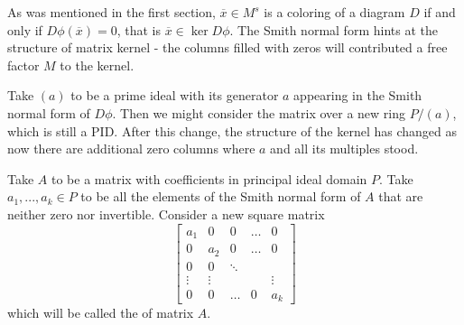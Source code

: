 %
%
%
As was mentioned in the first section, $\overline{x}\in M^s$ is a coloring of a diagram $D$ if and only if $D\phi(\overline{x})=0$, that is $\overline{x}\in\ker D\phi$. The Smith normal form hints at the structure of matrix kernel - the columns filled with zeros will contributed a free factor $M$ to the kernel. 

Take $(a)$ to be a prime ideal with its generator $a$ appearing in the Smith normal form of $D\phi$. Then we might consider the matrix over a new ring $P/(a)$, which is still a PID. After this change, the structure of the kernel has changed as now there are additional zero columns where $a$ and all its multiples stood.

\begin{definition}
  Take $A$ to be a matrix with coefficients in principal ideal domain $P$. Take $a_1,...,a_k\in P$ to be all the elements of the Smith normal form of $A$ that are neither zero nor invertible. Consider a new square matrix 
  $$
  \begin{bmatrix}
    a_1 & 0 & 0 & \hdots & 0\\ 
    0 & a_2 & 0 & \hdots & 0 \\ 
    0 & 0 & \ddots & &  \\ 
    \vdots & \vdots & & & \vdots \\ 
    0 & 0 & \hdots & 0 & a_k
  \end{bmatrix}
  $$
  which will be called the  of matrix $A$.
\end{definition}

